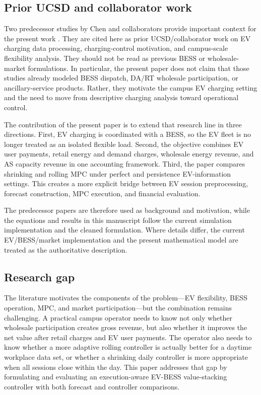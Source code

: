 \documentclass[final,5p,times]{elsarticle}
\begin{document}
\subsection{Prior UCSD and collaborator work}
Two predecessor studies by Chen and collaborators provide important context for the present work \cite{chen2024costoptimal,chen2026realtime}. They are cited here as prior UCSD/collaborator work on EV charging data processing, charging-control motivation, and campus-scale flexibility analysis. They should not be read as previous BESS or wholesale-market formulations. In particular, the present paper does not claim that those studies already modeled BESS dispatch, DA/RT wholesale participation, or ancillary-service products. Rather, they motivate the campus EV charging setting and the need to move from descriptive charging analysis toward operational control.

The contribution of the present paper is to extend that research line in three directions. First, EV charging is coordinated with a BESS, so the EV fleet is no longer treated as an isolated flexible load. Second, the objective combines EV user payments, retail energy and demand charges, wholesale energy revenue, and AS capacity revenue in one accounting framework. Third, the paper compares shrinking and rolling MPC under perfect and persistence EV-information settings. This creates a more explicit bridge between EV session preprocessing, forecast construction, MPC execution, and financial evaluation.

The predecessor papers are therefore used as background and motivation, while the equations and results in this manuscript follow the current simulation implementation and the cleaned formulation. Where details differ, the current EV/BESS/market implementation and the present mathematical model are treated as the authoritative description.
\subsection{Research gap}
The literature motivates the components of the problem---EV flexibility, BESS operation, MPC, and market participation---but the combination remains challenging. A practical campus operator needs to know not only whether wholesale participation creates gross revenue, but also whether it improves the net value after retail charges and EV user payments. The operator also needs to know whether a more adaptive rolling controller is actually better for a daytime workplace data set, or whether a shrinking daily controller is more appropriate when all sessions close within the day. This paper addresses that gap by formulating and evaluating an execution-aware EV-BESS value-stacking controller with both forecast and controller comparisons.
\end{document}

